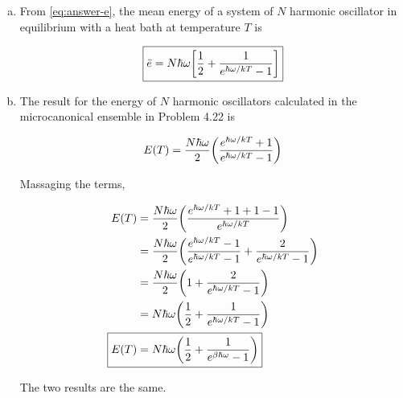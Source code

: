 \documentclass[12pt,a4paper,twocolumn]{article}
\begin{document}
\begin{enumerate}[(a)]
\item From \eqref{eq:answer-e}, the mean energy of a system of $N$ harmonic oscillator in equilibrium with a heat bath at temperature $T$ is

\begin{equation}
	\boxed{
	\bar{e} = N\hbar\omega\qty[\frac{1}{2} + \frac{1}{e^{\hbar\omega/kT} - 1}]
	} \label{eq:answer-b}
\end{equation}

\item The result for the energy of $N$ harmonic oscillators calculated in the microcanonical ensemble in Problem 4.22 is

\begin{equation}
	E(T) = \frac{N\hbar\omega}{2}\qty(\frac{e^{\hbar\omega/kT} + 1}{e^{\hbar\omega/kT} - 1}) \label{eq:problem422}
\end{equation}

Massaging the terms,

\begin{align}
	E(T) &= \frac{N\hbar\omega}{2} \qty(\frac{e^{\hbar\omega/kT}+1+1-1}{e^{\hbar\omega/kT}}) \nonumber \\
	&= \frac{N\hbar\omega}{2}\qty(\frac{e^{\hbar\omega/kT}-1}{e^{\hbar\omega/kT}-1}+\frac{2}{e^{\hbar\omega/kT}-1}) \nonumber \\
    &= \frac{N\hbar\omega}{2}\qty(1+\frac{2}{e^{\hbar\omega/kT}-1}) \nonumber \\
    &= N\hbar\omega\qty(\frac{1}{2}+\frac{1}{e^{\hbar\omega/kT}-1}) \nonumber \\
	\Aboxed{    
	    E(T) &= N\hbar\omega\qty(\frac{1}{2}+\frac{1}{e^{\beta\hbar\omega}-1})
	 } \label{eq:answer-c}
\end{align}

The two results are the same.

\end{enumerate}
\end{document}

